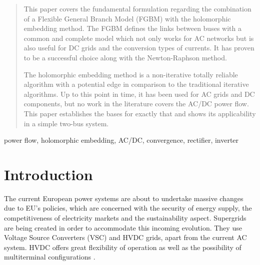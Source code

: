 \documentclass[conference]{IEEEtran}
\begin{document}
\begin{abstract}
This paper covers the fundamental formulation regarding the combination of a Flexible General Branch Model (FGBM) with the holomorphic embedding method. The FGBM defines the links between buses with a common and complete model which not only works for AC networks but is also useful for DC grids and the conversion types of currents. It has proven to be a successful choice along with the Newton-Raphson method.

The holomorphic embedding method is a non-iterative totally reliable algorithm with a potential edge in comparison to the traditional iterative algorithms. Up to this point in time, it has been used for AC grids and DC components, but no work in the literature covers the AC/DC power flow. This paper establishes the bases for exactly that and shows its applicability in a simple two-bus system.

\end{abstract}
\begin{IEEEkeywords}
power flow, holomorphic embedding, AC/DC, convergence, rectifier, inverter
\end{IEEEkeywords}  





%
\IEEEpeerreviewmaketitle

\section{Introduction}\label{secIntro}
The current European power systems are about to undertake massive changes due to EU's policies, which are concerned with the security of energy supply, the competitiveness of electricity markets and the sustainability aspect. Supergrids are being created in order to accommodate this incoming evolution. They use Voltage Source Converters (VSC) and HVDC grids, apart from the current AC system. HVDC offers great flexibility of operation as well as the possibility of multiterminal configurations \cite{Bompard}.
\end{document}
